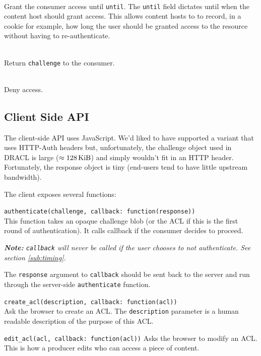 \documentclass[pdftex,12pt,a4papaer,twoside,notitlepage]{report}
\newcommand{\note}[1]{\vspace{1em} \begin{spacing}{1}\textit{\textbf{Note:} #1}\end{spacing}\vspace{1em}}
\begin{document}
\begin{compactitem}[$\lambda$]
 \begin{description}[labelindent=2em,leftmargin=4em]
 \item[\texttt{Grant(until)}] \hfill \\
   Grant the consumer access until \texttt{until}. The \texttt{until} field
   dictates until when the content host should grant access. This allows content
   hosts to to record, in a cookie for example, how long the user should be
   granted access to the resource without having to re-authenticate.
 \item[\texttt{Continue(challenge)}] \hfill \\
   Return \texttt{challenge} to the consumer.
 \item[\texttt{Deny}] \hfill \\
   Deny access.
 \end{description}
\end{compactitem}

\subsection{Client Side API}

The client-side API uses JavaScript. We'd liked to have supported a variant that
uses HTTP-Auth headers but, unfortunately, the challenge object used in DRACL is
large ($\approx\unit[128]{KiB}$) and simply wouldn't fit in an HTTP header.
Fortunately, the response object is tiny (end-users tend to have little upstream
bandwidth).

The client exposes several functions:

\begin{compactitem}[$\lambda$]
\item \verb=authenticate(challenge, callback: function(response))= \\
  This function takes an opaque challenge blob (or the ACL if this is the first
  round of authentication). It calls callback if the consumer decides to
  proceed.

  \note{\texttt{callback} will never be called if the user chooses to not
    authenticate. See section \ref{sub:timing}.}

  The \texttt{response} argument to \texttt{callback} should be sent back to the
  server and run through the server-side \texttt{authenticate} function.
\item \verb=create_acl(description, callback: function(acl))= \\
  Ask the browser to create an ACL. The \texttt{description} parameter is a human
  readable description of the purpose of this ACL.
\item \verb=edit_acl(acl, callback: function(acl))=
  Asks the browser to modify an ACL. This is how a producer edits who can access
  a piece of content.
\end{compactitem}
\end{document}
